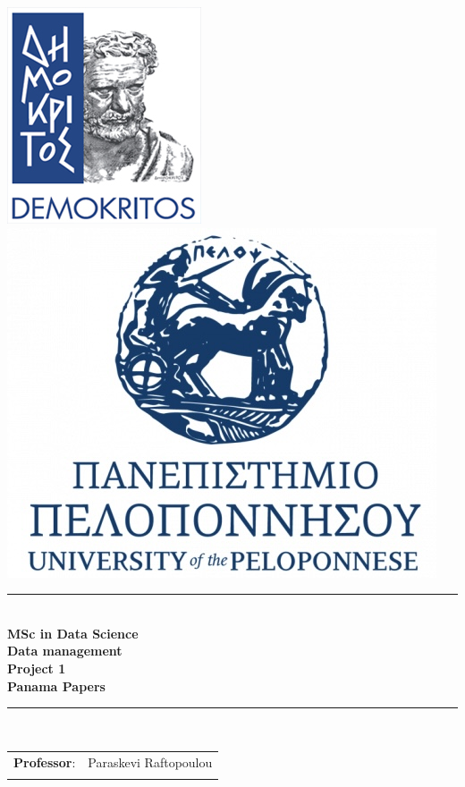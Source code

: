\documentclass{article}
\begin{document}
\begin{titlepage}
    \begin{center}

        \includegraphics[scale=0.6]{ncsr_logo.jpg}
        \includegraphics[scale=0.5]{uop_logo.jpg} \\[3cm]


        \rule{0.8\textwidth}{2pt} \\[0.5cm]
        \textbf{\Large{MSc in Data Science}} \\[0.5cm]
        \textbf{\Large{Data management}} \\[1.5cm]
        \textbf{\Large{Project 1}} \\[0.5cm]
        \textbf{{\Large{Panama Papers}}} \\[0.1cm]
        \rule{0.8\textwidth}{2pt} \\[3cm]

        \begin{tabular}{ll}
            \large{\textbf{Professor}:} & \large{Paraskevi Raftopoulou} \\\\
        \end{tabular}


\end{center}
\end{titlepage}
\end{document}
